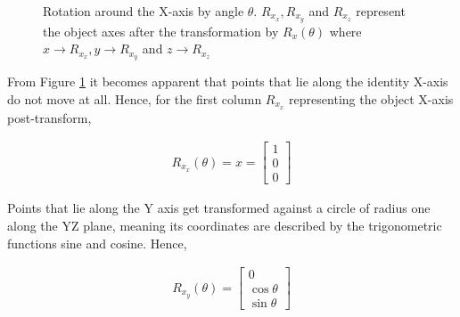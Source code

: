 \documentclass[12pt, a4paper]{article}
\begin{document}

\begin{figure}[H]
    \centering
    \caption{Rotation around the X-axis by angle $\theta$. $R_{x_x}, R_{x_y}$
        and $R_{x_z}$ represent the object axes after the transformation by
        $R_x(\theta)$ where $x \to R_{x_x}, y \to R_{x_y}$ and $z \to R_{x_z}$}
    \label{rot_x}
\end{figure}

From Figure \ref{rot_x} it becomes apparent that points that lie along the identity X-axis do
not move at all. Hence, for the first column $R_{x_x}$ representing the object
X-axis post-transform,

\begin{align*}
    R_{x_x}(\theta) = x = \begin{bmatrix} 1 \\
                              0 \\ 0\end{bmatrix}
\end{align*}

Points that lie along the Y axis get transformed against a circle of radius one
along the YZ plane, meaning  its coordinates are described by the trigonometric
functions sine and cosine. Hence,

\begin{align*}
    R_{x_y}(\theta) = \begin{bmatrix} 0 \\ \cos\theta \\ \sin\theta
                      \end{bmatrix}
\end{align*}
\end{document}
